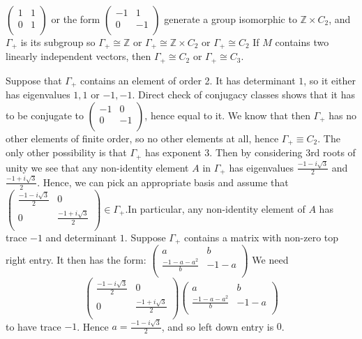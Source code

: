 \documentclass[a4paper]{article}
\begin{document}
    $\begin{pmatrix}
    1 & 1 \\ 
    0 & 1 \\
    \end{pmatrix}$ or the form 
    $\begin{pmatrix}
    -1 & 1 \\
    0 & -1 \\
    \end{pmatrix}$ generate a group isomorphic to $\mathbb{Z} \times C_2$, and $\Gamma_+$ is its subgroup so $\Gamma_+ \cong \mathbb{Z}$ or $\Gamma_+ \cong \mathbb{Z} \times C_2$ or $\Gamma_+ \cong C_2$
    \clm If $M$ contains two linearly independent vectors, then $\Gamma_+ \cong C_2$ or $\Gamma_+ \cong C_3$.
    
    Suppose that $\Gamma_+$ contains an element of order 2. It has determinant $1$, so it either has eigenvalues $1, 1$ or $-1, -1$. Direct check of conjugacy classes shows that it has to be conjugate to $\begin{pmatrix}
    -1 & 0 \\ 
    0 & -1 \\
    \end{pmatrix}$, hence equal to it. We know that then $\Gamma_+$ has no other elements of finite order, so no other elements at all, hence $\Gamma_+ \equiv C_2$.
    The only other possibility is that $\Gamma_+$ has exponent 3. Then by considering 3rd roots of unity we see that any non-identity element $A$ in $\Gamma_+$ has eigenvalues $\frac{-1-i\sqrt{3}}{2}$ and $\frac{-1+i\sqrt{3}}{2}$. Hence, we can pick an appropriate basis and assume that $\begin{pmatrix}
    \frac{-1-i\sqrt{3}}{2} & 0 \\ 
    0 &  \frac{-1+i\sqrt{3}}{2}\\
    \end{pmatrix} \in \Gamma_+$.In particular, any non-identity element of $A$ has trace $-1$ and determinant $1$. Suppose $\Gamma_+$ contains a matrix with non-zero top right entry. It then has the form:
    $\begin{pmatrix}
    a & b \\ 
    \frac{-1-a-a^2}{b} & -1-a \\
    \end{pmatrix}$ 
    We need 
    $$\begin{pmatrix}
    \frac{-1-i\sqrt{3}}{2} & 0 \\ 
    0 &  \frac{-1+i\sqrt{3}}{2}\\
    \end{pmatrix} \begin{pmatrix}
    a & b \\ 
    \frac{-1-a-a^2}{b} & -1-a \\
    \end{pmatrix}$$ to have trace $-1$. Hence $a = \frac{-1-i\sqrt{3}}{2}$, and so left down entry is $0$. 
\end{document}
